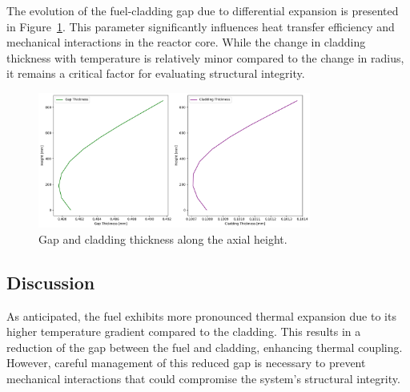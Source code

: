 The evolution of the fuel-cladding gap due to differential expansion is presented in Figure~\ref{fig:Gap_Cladding_Thickness}. This parameter significantly influences heat transfer efficiency and mechanical interactions in the reactor core. While the change in cladding thickness with temperature is relatively minor compared to the change in radius, it remains a critical factor for evaluating structural integrity.

\begin{figure}[H]
\centering
\includegraphics[width=0.8\textwidth]{4_gap_clad_thickness.png}
\caption{Gap and cladding thickness along the axial height.}
\label{fig:Gap_Cladding_Thickness}
\end{figure}

\subsection{Discussion}

As anticipated, the fuel exhibits more pronounced thermal expansion due to its higher temperature gradient compared to the cladding. This results in a reduction of the gap between the fuel and cladding, enhancing thermal coupling. However, careful management of this reduced gap is necessary to prevent mechanical interactions that could compromise the system's structural integrity.
